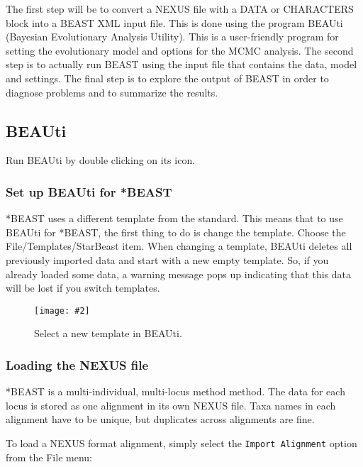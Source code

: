 \documentclass{article}
\newcommand{\includeimage}[2][]{%
\texttt{[image: \#2]}
}
\begin{document}
The first step will be to convert a NEXUS file with a DATA or CHARACTERS block into a BEAST XML input file. This is done using the program BEAUti (Bayesian Evolutionary Analysis Utility). This is a user-friendly program for setting the evolutionary model and options for the MCMC analysis. The second step is to actually run BEAST using the input file that contains the data, model and settings. The final step is to explore the output of BEAST in order to diagnose problems and to summarize the results.

\subsection*{BEAUti}

Run BEAUti by double clicking on its icon. 

\subsubsection*{Set up BEAUti for *BEAST}

*BEAST uses a different template from the standard. This means that to use BEAUti for *BEAST, the first thing to do is change the template. Choose the File/Templates/StarBeast item. When changing a template, BEAUti deletes all previously imported data and start with a new empty template. So, if you already loaded some data, a warning message pops up indicating that this data will be lost if you switch templates.

\begin{figure}
\centering
\includeimage[scale=0.5,clip=true,trim=0 300 200 0]{figures/BEAUti_selectTemplate}

\caption{\label{fig.template} Select a new template in BEAUti.}
\end{figure}


\def\mlstname{*BEAST}

\subsubsection*{Loading the NEXUS file }

\mlstname{} is a multi-individual, multi-locus method method. The data for each
locus is stored as one alignment in its own NEXUS file. Taxa names in each
alignment have to be unique, but duplicates across alignments are fine.

To load a NEXUS format alignment, simply select the \texttt{Import
Alignment} option from the File menu: 
\end{document}
